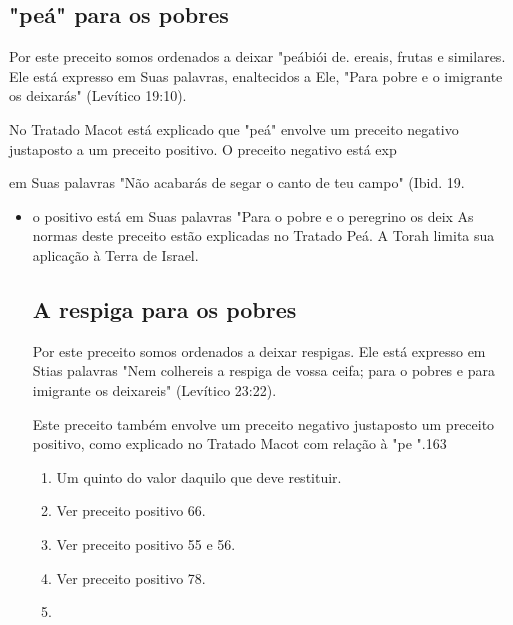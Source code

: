 \begin{itemize}
\begin{enumrate}
\begin{itemize}
\begin{itemize}
\section{"peá" para os pobres}

Por este preceito somos ordenados a deixar "peábiói
de. ereais, fru­tas e similares. Ele está expresso em
Suas palavras, enaltecidos a Ele, "Para
 pobre e o imigrante os deixarás" (Levítico 19:10).


No Tratado Macot está explicado que "peá" envolve um preceito negativo
justaposto a um preceito positivo. O preceito negativo está exp


em Suas palavras "Não acabarás de segar o canto de teu campo" (Ibid. 19.

\begin{itemize}
\item
 
 o positivo está em Suas palavras "Para o pobre e o peregrino os deix
 As normas deste preceito estão explicadas no Tratado Peá. A Torah
 limita sua aplicação à Terra de Israel.


\section{A respiga para os pobres}

Por este preceito somos ordenados a deixar respigas. Ele está expresso
em Stias palavras "Nem colhereis a respiga de vossa ceifa; para o pobres
e para
 imigrante os deixareis" (Levítico 23:22).


Este preceito também envolve um preceito negativo justaposto um preceito
positivo, como explicado no Tratado Macot com relação à "pe ".163


\begin{enumerate}
\def\labelenumi{\arabic{enumi}.}
\setcounter{enumi}{155}
\item
 
 Um quinto do valor daquilo que deve restituir.
 
\item
 
 Ver preceito positivo 66.
 
\item
 
 Ver preceito positivo 55 e 56.
 
\item
 
 Ver preceito positivo 78.
 
\item
 

\end{enumerate}
\end{itemize}
\end{itemize}
\end{itemize}
\end{enumrate}
\end{itemize}
